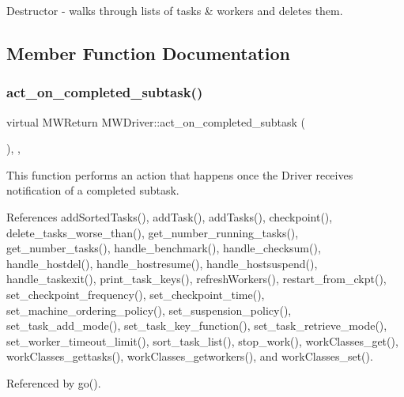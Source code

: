 Destructor -\/ walks through lists of tasks \& workers and deletes them. 

\subsection{Member Function Documentation}
\mbox{\label{classMWDriver_aeb92065d166911049bec838253554555}} 
\subsubsection{\texorpdfstring{act\+\_\+on\+\_\+completed\+\_\+subtask()}{act\_on\_completed\_subtask()}}
{\footnotesize\ttfamily virtual M\+W\+Return M\+W\+Driver\+::act\+\_\+on\+\_\+completed\+\_\+subtask (\begin{DoxyParamCaption}\item[{\hyperlink{classMWTask}{M\+W\+Task} $\ast$}]{ }\end{DoxyParamCaption})\hspace{0.3cm}{\ttfamily [inline]}, {\ttfamily [protected]}, {\ttfamily [virtual]}}

This function performs an action that happens once the Driver receives notification of a completed subtask. 

References add\+Sorted\+Tasks(), add\+Task(), add\+Tasks(), checkpoint(), delete\+\_\+tasks\+\_\+worse\+\_\+than(), get\+\_\+number\+\_\+running\+\_\+tasks(), get\+\_\+number\+\_\+tasks(), handle\+\_\+benchmark(), handle\+\_\+checksum(), handle\+\_\+hostdel(), handle\+\_\+hostresume(), handle\+\_\+hostsuspend(), handle\+\_\+taskexit(), print\+\_\+task\+\_\+keys(), refresh\+Workers(), restart\+\_\+from\+\_\+ckpt(), set\+\_\+checkpoint\+\_\+frequency(), set\+\_\+checkpoint\+\_\+time(), set\+\_\+machine\+\_\+ordering\+\_\+policy(), set\+\_\+suspension\+\_\+policy(), set\+\_\+task\+\_\+add\+\_\+mode(), set\+\_\+task\+\_\+key\+\_\+function(), set\+\_\+task\+\_\+retrieve\+\_\+mode(), set\+\_\+worker\+\_\+timeout\+\_\+limit(), sort\+\_\+task\+\_\+list(), stop\+\_\+work(), work\+Classes\+\_\+get(), work\+Classes\+\_\+gettasks(), work\+Classes\+\_\+getworkers(), and work\+Classes\+\_\+set().



Referenced by go().

